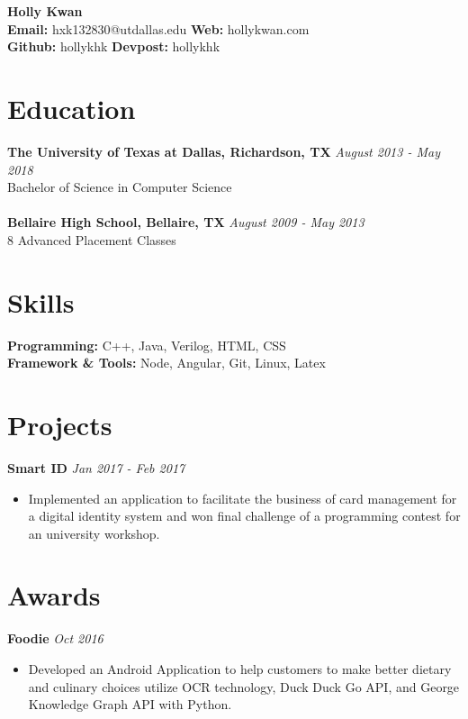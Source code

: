 \documentclass[10pt,a4paper,sans]{article}
\author{Holly Kwan}
\renewcommand\maketitle{}
\begin{document}
\begin{center}
\fontsize{10}{12}
{\textbf {Holly Kwan} \\
\textbf {Email:} hxk132830@utdallas.edu \textbf {Web:} hollykwan.com  }\\ 
\textbf {Github:} hollykhk \textbf {Devpost:} hollykhk \\
\end{center}
\maketitle
\section{Education}
{\bf The University of Texas at Dallas, Richardson, TX} \hfill {\em August 2013 - May 2018} 
\\ Bachelor of Science in Computer Science\hfill {  }
\\
\\{\bf Bellaire High School, Bellaire, TX} \hfill {\em August 2009 - May 2013} 
\\ 8 Advanced Placement Classes\hfill {  }
\section{Skills}
\textbf{Programming:} C++, Java, Verilog, HTML, CSS \\
\textbf{Framework \& Tools:} Node, Angular, Git, Linux, Latex 
\section{Projects}
{\bf Smart ID} \hfill {\em Jan 2017 - Feb 2017}
\begin{itemize}
    \item Implemented an application to facilitate the business of card management for a digital identity system and won final challenge of a programming contest for an university workshop.
\end{itemize}
\section{Awards}
{\bf Foodie} \hfill {\em Oct 2016}
\begin{itemize}
    \item Developed an Android Application to help customers to make better dietary and culinary choices utilize OCR technology, Duck Duck Go API, and George Knowledge Graph API with Python. 
\end{itemize}
\end{document}
